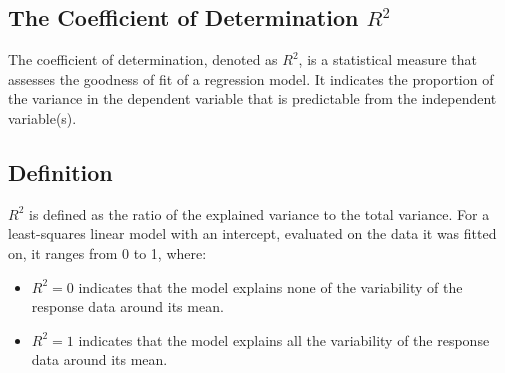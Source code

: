 \begin{notechapter}
\chapter{The Coefficient of Determination $R^2$}\label{ch:r-squared}

The coefficient of determination, denoted as \( R^2 \), is a statistical 
measure that assesses the goodness of fit of a regression model. It 
indicates the proportion of the variance in the dependent variable that 
is predictable from the independent variable(s).

\section{Definition}
\( R^2 \) is defined as the ratio of the explained variance to the total
variance. For a least-squares linear model with an intercept, evaluated on
the data it was fitted on, it ranges from 0 to 1, where:
\begin{itemize}
    \item \( R^2 = 0 \) indicates that the model explains none of the 
          variability of the response data around its mean.
    \item \( R^2 = 1 \) indicates that the model explains all the 
          variability of the response data around its mean.
\end{itemize}


\end{notechapter}
